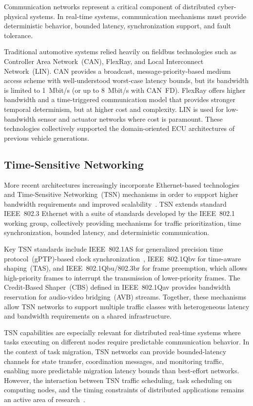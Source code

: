 Communication networks represent a critical component of
distributed cyber-physical systems. In real-time systems,
communication mechanisms must provide deterministic behavior,
bounded latency, synchronization support, and fault tolerance.

Traditional automotive systems relied heavily on fieldbus
technologies such as Controller Area Network~(CAN),
FlexRay, and Local Interconnect Network~(LIN). CAN provides
a broadcast, message-priority-based medium access scheme
with well-understood worst-case latency bounds, but its
bandwidth is limited to 1~Mbit/s (or up to 8~Mbit/s with
CAN~FD). FlexRay offers higher bandwidth and a time-triggered
communication model that provides stronger temporal
determinism, but at higher cost and complexity. LIN is used
for low-bandwidth sensor and actuator networks where cost
is paramount. These technologies collectively supported the
domain-oriented ECU architectures of previous vehicle
generations.

\subsection{Time-Sensitive Networking}
\label{subsec:tsn}

More recent architectures increasingly incorporate
Ethernet-based technologies and Time-Sensitive Networking~(TSN)
mechanisms in order to support higher bandwidth requirements
and improved scalability~\cite{ieee8021q2022}. TSN extends
standard IEEE~802.3 Ethernet with a suite of standards
developed by the IEEE~802.1 working group, collectively
providing mechanisms for traffic prioritization, time
synchronization, bounded latency, and deterministic
communication.

Key TSN standards include IEEE~802.1AS for generalized
precision time protocol~(gPTP)-based clock
synchronization~\cite{ieee8021as2020}, IEEE~802.1Qbv for
time-aware shaping~(TAS), and IEEE~802.1Qbu/802.3br for
frame preemption, which allows high-priority frames to
interrupt the transmission of lower-priority frames. The
Credit-Based Shaper~(CBS) defined in IEEE~802.1Qav provides
bandwidth reservation for audio-video bridging~(AVB) streams.
Together, these mechanisms allow TSN networks to support
multiple traffic classes with heterogeneous latency and
bandwidth requirements on a shared infrastructure.

TSN capabilities are especially relevant for distributed
real-time systems where tasks executing on different nodes
require predictable communication behavior. In the context
of task migration, TSN networks can provide bounded-latency
channels for state transfer, coordination messages, and
monitoring traffic, enabling more predictable migration
latency bounds than best-effort networks. However, the
interaction between TSN traffic scheduling, task scheduling
on computing nodes, and the timing constraints of
distributed applications remains an active area of
research~\cite{craciunas2016}.

